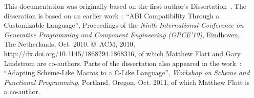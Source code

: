This documentation was originally based on the first author's
Dissertation~\cite{abi-diss}.  The disseration is based on an earlier
work~\cite{abi-gpce10}: ``ABI Compatibility Through a Customizable
Language'', Proceedings of the
\textit{Ninth International Conference on Generative Programming and
  Component Engineering (GPCE'10)}, Eindhoven, The Netherlands,
Oct. 2010. \copyright\ ACM, 2010,
\url{http://dx.doi.org/10.1145/1868294.1868316}, of which Matthew Flatt 
and Gary Lindstrom are co-authors.  Parts of the dissertation also
appeared in the work~\cite{zl-scheme11}: ``Adapting Scheme-Like Macros
to a C-Like Language'', \textit{Workshop on Scheme and Functional
Programming}, Portland, Oregon, Oct. 2011, of which Matthew Flatt is a
co-author.
